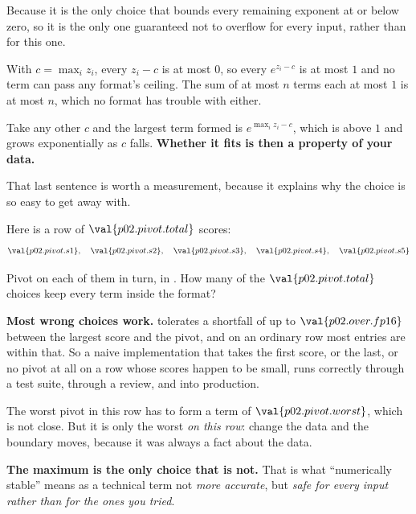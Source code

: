 \begin{fr}
\begin{ansblock}
Because it is the only choice that bounds every remaining exponent at or below
zero, so it is the only one guaranteed not to overflow \dash{} for every input,
rather than for this one.
\end{ansblock}

With $c = \max_i z_i$, every $z_i - c$ is at most $0$, so every $e^{z_i - c}$
is at most $1$ and no term can pass any format's ceiling. The sum of at most
$n$ terms each at most $1$ is at most $n$, which no format has trouble with
either.

Take any other $c$ and the largest term formed is $e^{\max_i z_i - c}$, which
is above $1$ and grows exponentially as $c$ falls. \textbf{Whether it fits is
then a property of your data.}
\end{fr}


\begin{fr}
That last sentence is worth a measurement, because it explains why the choice
is so easy to get away with.

Here is a row of $\val{p02.pivot.total}$ scores:
\[ \val{p02.pivot.s1}, \quad \val{p02.pivot.s2}, \quad
   \val{p02.pivot.s3}, \quad \val{p02.pivot.s4}, \quad \val{p02.pivot.s5} \]

Pivot on each of them in turn, in . How many of the
$\val{p02.pivot.total}$ choices keep every term inside the format?
\nextframe
\end{fr}

\begin{fr}
\begin{trapbox}
\textbf{Most wrong choices work.}  tolerates a shortfall of up to
$\val{p02.over.fp16}$ between the largest score and the pivot, and on an
ordinary row most entries are within that. So a naive implementation that
takes the first score, or the last, or no pivot at all on a row whose scores
happen to be small, runs correctly \dash{} through a test suite, through a
review, and into production.

The worst pivot in this row has to form a term of $\val{p02.pivot.worst}$,
which is not close. But it is only the worst \emph{on this row}: change the
data and the boundary moves, because it was always a fact about the data.

\textbf{The maximum is the only choice that is not.} That is what
\enquote{numerically stable} means as a technical term \dash{} not \emph{more accurate}, but \emph{safe for every input
rather than for the ones you tried}.
\end{trapbox}
\end{fr}

